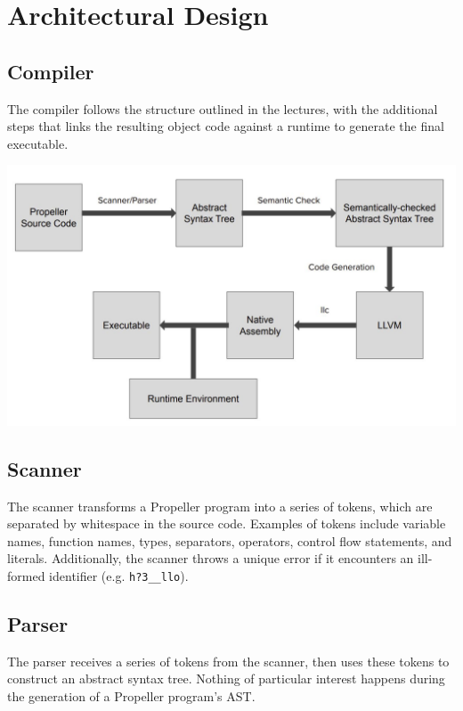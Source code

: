 \section{Architectural Design}

\subsection{Compiler}

The compiler follows the structure outlined in the lectures, with the additional steps that
links the resulting object code against a runtime to generate the final executable.
\begin{center}
    \includegraphics[scale=0.5]{block.jpg}
\end{center}

\subsection{Scanner}
The scanner transforms a Propeller program into a series of tokens, which are separated by
whitespace in the source code. Examples of tokens include variable names, function names,
types, separators, operators, control flow statements, and literals. Additionally, the
scanner throws a unique error if it encounters an ill-formed identifier (e.g.
\texttt{h?3\_\_llo}).

\subsection{Parser}
The parser receives a series of tokens from the scanner, then uses these tokens to construct
an abstract syntax tree. Nothing of particular interest happens during the generation
of a Propeller program's AST.

